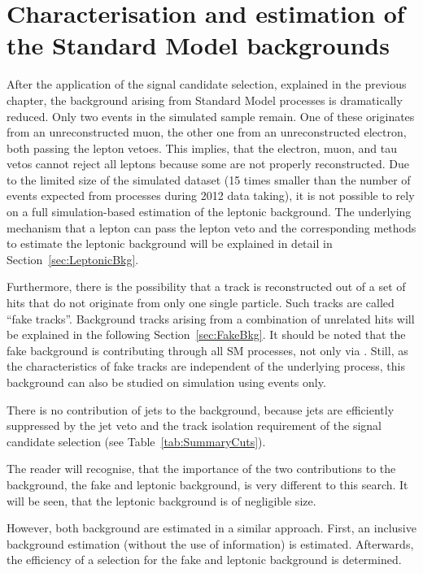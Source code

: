 \FloatBarrier
\chapter{Characterisation and estimation of the Standard Model backgrounds}
\label{ch:BackgroundEstimation}
After the application of the signal candidate selection, explained in the previous chapter, the background arising from Standard Model processes is dramatically reduced.
Only two events in the simulated \WJets sample remain.
One of these originates from an unreconstructed muon, the other one from an unreconstructed electron, both passing the lepton vetoes.
This implies, that the electron, muon, and tau vetos cannot reject all leptons because some are not properly reconstructed.
Due to the limited size of the simulated \WJets dataset (15 times smaller than the number of events expected from \WJets processes during 2012 data taking), 
it is not possible to rely on a full simulation-based estimation of the leptonic background.
The underlying mechanism that a lepton can pass the lepton veto and the corresponding methods to estimate the leptonic background will be explained in detail in Section~\ref{sec:LeptonicBkg}.

Furthermore, there is the possibility that a track is reconstructed out of a set of hits that do not originate from only one single particle.
Such tracks are called ``fake tracks''. 
Background tracks arising from a combination of unrelated hits will be explained in the following Section~\ref{sec:FakeBkg}.
It should be noted that the fake background is contributing through all SM processes, not only via \WJets.
Still, as the characteristics of fake tracks are independent of the underlying process, this background can also be studied on simulation using \WJets events only.

There is no contribution of jets to the background, because jets are efficiently suppressed by the jet veto and the track isolation requirement of the signal candidate selection (see Table~\ref{tab:SummaryCuts}).

The reader will recognise, that the importance of the two contributions to the background, the fake and leptonic background, is very different to this search.
It will be seen, that the leptonic background is of negligible size.

However, both background are estimated in a similar approach.
First, an inclusive background estimation (without the use of \dedx information) is estimated.
Afterwards, the efficiency of a \dedx selection for the fake and leptonic background is determined.

